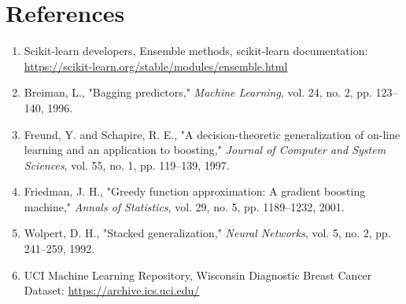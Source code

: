 \documentclass[12pt,a4paper]{article}
\begin{document}
\section{References}
\begin{enumerate}
\item Scikit-learn developers, Ensemble methods, scikit-learn documentation: \url{https://scikit-learn.org/stable/modules/ensemble.html}

\item Breiman, L., "Bagging predictors," \textit{Machine Learning}, vol. 24, no. 2, pp. 123--140, 1996.

\item Freund, Y. and Schapire, R. E., "A decision-theoretic generalization of on-line learning and an application to boosting," \textit{Journal of Computer and System Sciences}, vol. 55, no. 1, pp. 119--139, 1997.

\item Friedman, J. H., "Greedy function approximation: A gradient boosting machine," \textit{Annals of Statistics}, vol. 29, no. 5, pp. 1189--1232, 2001.

\item Wolpert, D. H., "Stacked generalization," \textit{Neural Networks}, vol. 5, no. 2, pp. 241--259, 1992.

\item UCI Machine Learning Repository, Wisconsin Diagnostic Breast Cancer Dataset: \url{https://archive.ics.uci.edu/}
\end{enumerate}
\end{document}
